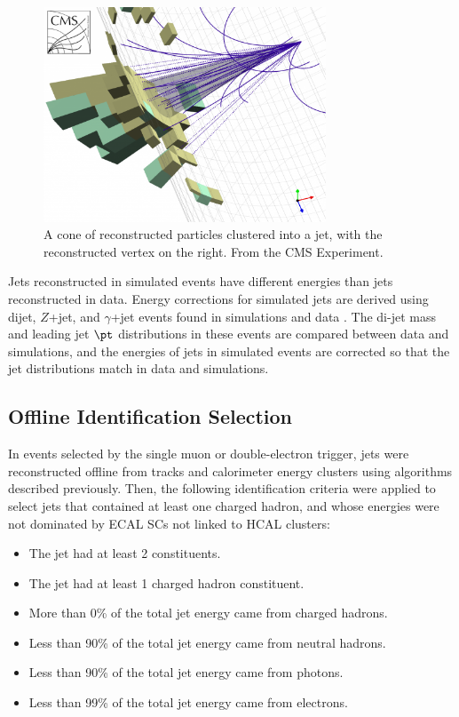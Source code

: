 \begin{figure}[h]
	\centering
	\includegraphics[width=0.75\textwidth]{figures/jetClusteringInCMS.png}
	\caption{A cone of reconstructed particles clustered into a jet, with the reconstructed vertex on the right.  
	From the CMS Experiment.}
	\label{fig:jetClustering}
\end{figure}

Jets reconstructed in simulated events have different energies than jets reconstructed in data.  Energy corrections for 
simulated jets are derived using dijet, $Z$+jet, and $\gamma$+jet events found in simulations and data 
\cite{jetpaper}.  The di-jet mass and leading jet $\pt$ distributions in these events are compared between data and simulations, and 
the energies of jets in simulated events are corrected so that the jet distributions match in data and simulations.

\subsection{Offline Identification Selection}
In events selected by the single muon or double-electron trigger, jets were reconstructed offline from tracks and calorimeter energy 
clusters using algorithms described previously.  Then, the following identification criteria were applied to select 
jets that contained at least one charged hadron, and whose energies were not dominated by ECAL SCs not linked to HCAL clusters:

\begin{itemize}
	\item The jet had at least 2 constituents.
	\item The jet had at least 1 charged hadron constituent.
	\item More than 0\% of the total jet energy came from charged hadrons.
	\item Less than 90\% of the total jet energy came from neutral hadrons.
	\item Less than 90\% of the total jet energy came from photons.
	\item Less than 99\% of the total jet energy came from electrons.
\end{itemize}

